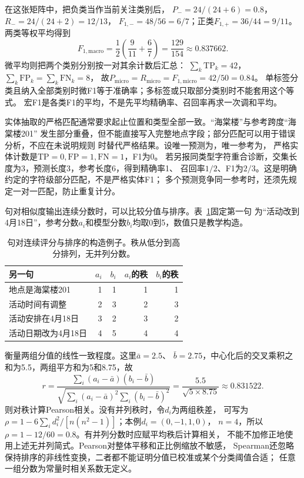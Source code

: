在这张矩阵中，把负类当作当前关注类别后，
$P_-=24/(24+6)=0.8$，$R_-=24/(24+2)=12/13$，
$F_{1,-}=48/56=6/7$；正类$F_{1,+}=36/44=9/11$。
两类等权平均得到
\begin{equation}
 F_{1,\mathrm{macro}}
 =\frac12\left(\frac9{11}+\frac67\right)
 =\frac{129}{154}\approx0.837662.
 \label{eq:nlp-macro-f1}
\end{equation}
微平均则把两个类别分别按一对其余计数后汇总：
$\sum_k\mathrm{TP}_k=42$，$\sum_k\mathrm{FP}_k=\sum_k\mathrm{FN}_k=8$，
故$P_{\mathrm{micro}}=R_{\mathrm{micro}}=F_{1,\mathrm{micro}}=42/50=0.84$。
单标签分类且纳入全部类别时微F1等于准确率；多标签或只取部分类别时不能套用这个等式。
宏F1是各类F1的平均，不是先平均精确率、召回率再求一次调和平均。

实体抽取的严格匹配通常要求起止位置和类型全部一致。“海棠楼”与参考跨度“海棠楼201”
发生部分重叠，但不能直接写入完整地点字段；部分匹配可以用于错误分析，不应在未说明规则
时替代严格结果。设唯一预测为\code{LOC:[39,42)}，唯一参考为\code{LOC:[39,45)}，
严格实体计数是$\mathrm{TP}=0,\mathrm{FP}=1,\mathrm{FN}=1$，F1为0。
若另报同类型字符重合诊断，交集长度为3，预测长度3，参考长度6，得到精确率1、
召回率$1/2$、F1为$2/3$。这是明确约定的字符级部分匹配，不是严格实体F1；
多个预测竞争同一参考时，还须先规定一对一匹配，防止重复计分。

句对相似度输出连续分数时，可以比较分值与排序。表~\ref{tab:nlp-correlation}固定第一句
为“活动改到4月18日”，参考分数$a_i$和模型分数$b_i$均取0到5，数值只是教学构造。

\begin{table}[htbp]
 \centering
 \begin{tabularx}{\linewidth}{@{}Xrrrr@{}}
  \toprule
  另一句 & $a_i$ & $b_i$ & $a_i$的秩 & $b_i$的秩\\
  \midrule
  地点是海棠楼201 & 1 & 1 & 1 & 1\\
  活动时间有调整 & 2 & 3 & 2 & 3\\
  活动安排在4月18日 & 3 & 2 & 3 & 2\\
  活动日期改为4月18日 & 4 & 5 & 4 & 4\\
  \bottomrule
 \end{tabularx}
 \caption{句对连续评分与排序的构造例子。秩从低分到高分排列，无并列分数。}
 \label{tab:nlp-correlation}
\end{table}

衡量两组分值的线性一致程度。这里$\bar a=2.5$、
$\bar b=2.75$，中心化后的交叉乘积之和为5.5，两组平方和为5和8.75，故
\begin{equation}
 r=\frac{\sum_i(a_i-\bar a)(b_i-\bar b)}
 {\sqrt{\sum_i(a_i-\bar a)^2\sum_i(b_i-\bar b)^2}}
 =\frac{5.5}{\sqrt{5\times8.75}}\approx0.831522.
 \label{eq:nlp-pearson}
\end{equation}
则对秩计算Pearson相关。没有并列秩时，令$d_i$为两组秩差，
可写为$\rho=1-6\sum_i d_i^2/[n(n^2-1)]$；本例$d_i=(0,-1,1,0)$，
$n=4$，所以$\rho=1-12/60=0.8$。有并列分数时应赋平均秩后计算相关，
不能不加修正地使用上述无并列简式。Pearson对整体平移和正比例缩放不敏感，
Spearman还忽略保持排序的非线性变换，二者都不能证明分值已校准或某个分类阈值合适；
任意一组分数为常量时相关系数无定义。

